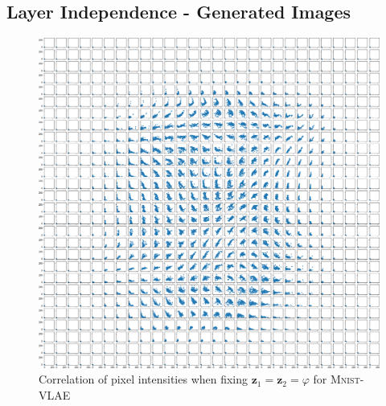 \documentclass{beamer}
\begin{document}
\subsection{Layer Independence - Generated Images}
\begin{frame}
\begin{figure}
\centering
\includegraphics[width=.7\textwidth]{images/notprop/mnist/vlae/ccs_0_1_vlae.png}
\caption{Correlation of pixel intensities when fixing $\bm{z}_1 = \bm{z}_2=\varphi$ for \textsc{Mnist}-VLAE}
\end{figure}
\end{frame}
\end{document}
